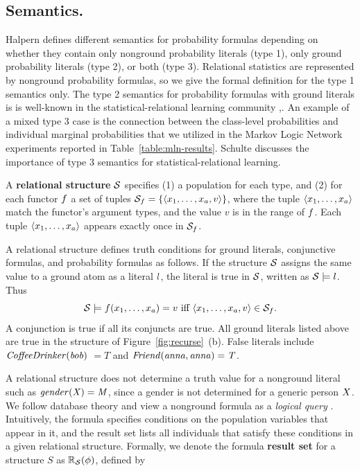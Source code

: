 \documentclass[oribibl]{llncs}
\begin{document}
\subsection{Semantics.} Halpern defines different semantics for probability formulas depending on whether they contain only nonground probability literals (type 1), only ground probability literals (type 2), or both (type 3). Relational statistics are represented by nonground probability formulas, so we give the formal definition for the type 1 semantics only.   
The type 2 semantics for probability formulas with ground literals is is well-known in the statistical-relational learning community \cite{Cussen2007,Milch2007},\cite[Ch.14.6.1]{Russell2010}.  An example of a mixed type 3 case is the connection between the class-level probabilities and individual marginal probabilities that we utilized in the Markov Logic Network experiments reported in Table~\ref{table:mln-results}. Schulte \cite{Schulte2012c} discusses the importance of type 3 semantics for statistical-relational learning. 

A \textbf{relational structure} $\mathcal{S}$ specifies (1) a population for each type, and (2) for each functor $f$ a set of tuples $\mathcal{S}_{f} = \{\langle x_{1},\ldots,x_{a},v\rangle\}$, where the tuple $\langle x_{1},\ldots,x_{a} \rangle$ match the functor's argument types, and the value $v$ is in the range of $f$. Each tuple $\langle x_{1},\ldots,x_{a} \rangle$ appears exactly once in $\mathcal{S}_{f}$. 

A relational structure defines truth conditions for ground literals, conjunctive formulas, and probability formulas as follows.
 If the structure $\mathcal{S}$ assigns the same value to a ground atom as a literal $l$, the literal is true in $\mathcal{S}$, written as $\mathcal{S} \models l$. Thus
 $$\mathcal{S} \models f(x_{1},\ldots,x_{a}) = v \mbox{ iff } \langle x_{1},\ldots,x_{a},v \rangle \in \mathcal{S}_{f}.$$
 A conjunction is true if all its conjuncts are true. 
All ground literals listed above are true in the structure of Figure~\ref{fig:recurse}~(b). False literals include $\it{CoffeeDrinker}(bob)$ $ = T$ and $\it{Friend}(anna,anna) = \mathit{T}$.

A relational structure does not determine a truth value for a nonground literal such as $\it{gender}(X) = M$, since a gender is not determined for a generic person $X$. 
We follow database theory and view a nonground formula as a {\em logical query} \cite{Ullman1982}. Intuitively, the formula specifies conditions on the population variables that appear in it, and the result set lists all individuals that satisfy these conditions in a given relational structure.  Formally, we denote the formula \textbf{result set} for a structure $S$ as $\mathbb{R}_{\mathcal{S}}(\phi)$, defined by
\end{document}
